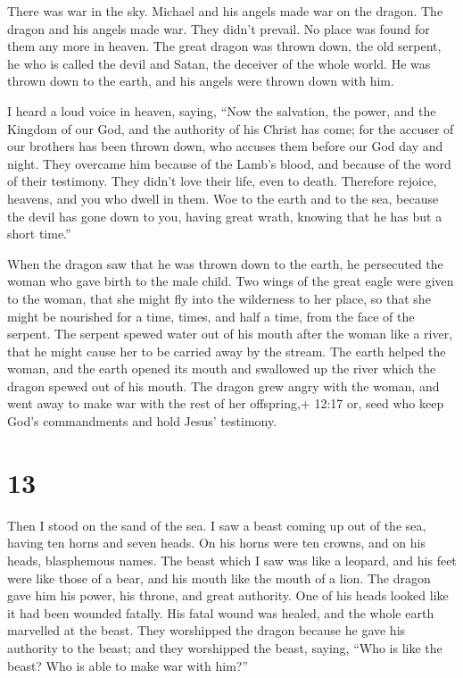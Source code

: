  There was war in the sky. Michael and his angels made war
on the dragon. The dragon and his angels made war.  They
didn't prevail. No place was found for them any more in heaven.
 The great dragon was thrown down, the old serpent, he who
is called the devil and Satan, the deceiver of the whole world. He was
thrown down to the earth, and his angels were thrown down with him.

 I heard a loud voice in heaven, saying, ``Now the
salvation, the power, and the Kingdom of our God, and the authority of
his Christ has come; for the accuser of our brothers has been thrown
down, who accuses them before our God day and night.  They
overcame him because of the Lamb's blood, and because of the word of
their testimony. They didn't love their life, even to death.
 Therefore rejoice, heavens, and you who dwell in them. Woe
to the earth and to the sea, because the devil has gone down to you,
having great wrath, knowing that he has but a short time.''

 When the dragon saw that he was thrown down to the earth,
he persecuted the woman who gave birth to the male child. 
Two wings of the great eagle were given to the woman, that she might fly
into the wilderness to her place, so that she might be nourished for a
time, times, and half a time, from the face of the serpent.
 The serpent spewed water out of his mouth after the woman
like a river, that he might cause her to be carried away by the stream.
 The earth helped the woman, and the earth opened its mouth
and swallowed up the river which the dragon spewed out of his mouth.
 The dragon grew angry with the woman, and went away to
make war with the rest of her offspring,+ 12:17 or, seed who keep God's
commandments and hold Jesus' testimony.

\hypertarget{section-12}{%
\section{13}\label{section-12}}

 Then I stood on the sand of the sea. I saw a beast coming
up out of the sea, having ten horns and seven heads. On his horns were
ten crowns, and on his heads, blasphemous names.  The beast
which I saw was like a leopard, and his feet were like those of a bear,
and his mouth like the mouth of a lion. The dragon gave him his power,
his throne, and great authority.  One of his heads looked
like it had been wounded fatally. His fatal wound was healed, and the
whole earth marvelled at the beast.  They worshipped the
dragon because he gave his authority to the beast; and they worshipped
the beast, saying, ``Who is like the beast? Who is able to make war with
him?''

